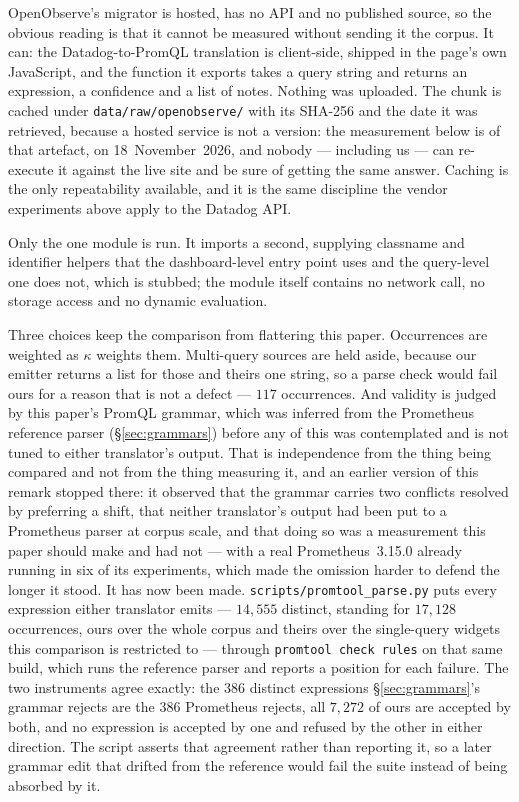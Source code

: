 \begin{remark}\label{rem:baseline}
OpenObserve's migrator is hosted, has no API and no published source, so the obvious
reading is that it cannot be measured without sending it the corpus. It can: the
Datadog-to-PromQL translation is client-side, shipped in the page's own JavaScript, and
the function it exports takes a query string and returns an expression, a confidence and
a list of notes. Nothing was uploaded. The chunk is cached under
\texttt{data/raw/openobserve/} with its SHA-256 and the date it was retrieved, because a
hosted service is not a version: the measurement below is of that artefact, on
18~November~2026, and nobody --- including us --- can re-execute it against the live
site and be sure of getting the same answer. Caching is the only repeatability available,
and it is the same discipline the vendor experiments above apply to the Datadog API.

Only the one module is run. It imports a second, supplying classname and identifier
helpers that the dashboard-level entry point uses and the query-level one does not, which
is stubbed; the module itself contains no network call, no storage access and no dynamic
evaluation.

Three choices keep the comparison from flattering this paper. Occurrences are weighted as
$\kappa$ weights them. Multi-query sources are held aside, because our emitter returns a
list for those and theirs one string, so a parse check would fail ours for a reason that
is not a defect --- $117$ occurrences. And validity is judged by this paper's PromQL
grammar, which was inferred from the Prometheus reference parser (\S\ref{sec:grammars})
before any of this was contemplated and is not tuned to either translator's output. That
is independence from the thing being compared and not from the thing measuring it, and an
earlier version of this remark stopped there: it observed that the grammar carries two
conflicts resolved by preferring a shift, that neither translator's output had been put to
a Prometheus parser at corpus scale, and that doing so was a measurement this paper should
make and had not --- with a real Prometheus~3.15.0 already running in six of its
experiments, which made the omission harder to defend the longer it stood. It has now been
made. \texttt{scripts/promtool\_parse.py} puts every expression either translator emits
--- $14{,}555$ distinct, standing for $17{,}128$ occurrences, ours over the whole corpus
and theirs over the single-query widgets this comparison is restricted to --- through \texttt{promtool check rules} on that same
build, which runs the reference parser and reports a position for each failure. The two
instruments agree exactly: the $386$ distinct expressions \S\ref{sec:grammars}'s grammar
rejects are the $386$ Prometheus rejects, all $7{,}272$ of ours are accepted by both, and
no expression is accepted by one and refused by the other in either direction. The script
asserts that agreement rather than reporting it, so a later grammar edit that drifted from
the reference would fail the suite instead of being absorbed by it.


\end{remark}
